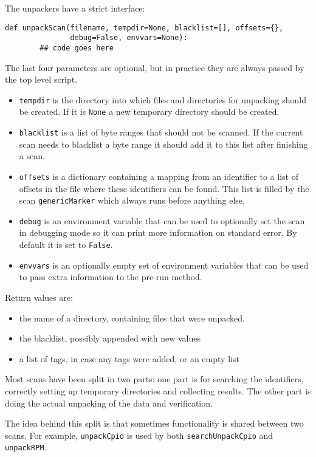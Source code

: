 \documentclass[10pt]{article}
\begin{document}
The unpackers have a strict interface:

\begin{verbatim}
def unpackScan(filename, tempdir=None, blacklist=[], offsets={},
               debug=False, envvars=None):
        ## code goes here
\end{verbatim}

The last four parameters are optional, but in practice they are always passed
by the top level script.

\begin{itemize}
\item \texttt{tempdir} is the directory into which files and directories for
unpacking should be created. If it is \texttt{None} a new temporary directory
should be created.
\item \texttt{blacklist} is a list of byte ranges that should not be scanned.
If the current scan needs to blacklist a byte range it should add it to this
list after finishing a scan.
\item \texttt{offsets} is a dictionary containing a mapping from an identifier
to a list of offsets in the file where these identifiers can be found. This
list is filled by the scan \texttt{genericMarker} which always runs before
anything else.
\item \texttt{debug} is an environment variable that can be used to optionally
set the scan in debugging mode so it can print more information on standard
error. By default it is set to \texttt{False}.
\item \texttt{envvars} is an optionally empty set of environment variables that
can be used to pass extra information to the pre-run method.
\end{itemize}

Return values are:

\begin{itemize}
\item the name of a directory, containing files that were unpacked.
\item the blacklist, possibly appended with new values
\item a list of tags, in case any tags were added, or an empty list
\end{itemize}

Most scans have been split in two parts: one part is for searching the
identifiers, correctly setting up temporary directories and collecting results.
The other part is doing the actual unpacking of the data and verification.

The idea behind this split is that sometimes functionality is shared between
two scans. For example, \texttt{unpackCpio} is used by both
\texttt{searchUnpackCpio} and \texttt{unpackRPM}.
\end{document}
